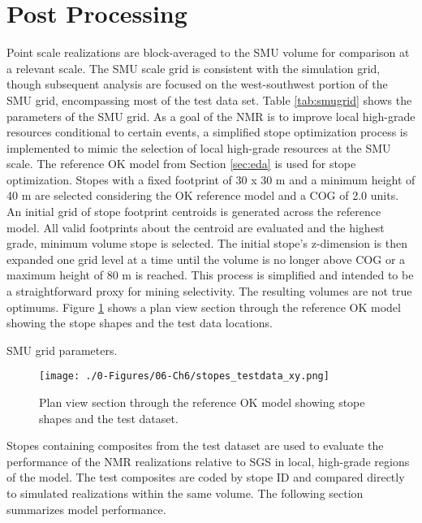 \FloatBarrier
\section{Post Processing}
\label{sec:post}

Point scale realizations are block-averaged to the \gls{SMU} volume for comparison at a relevant scale. The \gls{SMU} scale grid is consistent with the simulation grid, though subsequent analysis are focused on the west-southwest portion of the \gls{SMU} grid, encompassing most of the test data set. Table \ref{tab:smugrid} shows the parameters of the \gls{SMU} grid. As a goal of the \gls{NMR} is to improve local high-grade resources conditional to certain events, a simplified stope optimization process is implemented to mimic the selection of local high-grade resources at the \gls{SMU} scale. The reference \gls{OK} model from Section \ref{sec:eda} is used for stope optimization. Stopes with a fixed footprint of 30 x 30 m and a minimum height of 40 m are selected considering the \gls{OK} reference model and a \gls{COG} of 2.0 units. An initial grid of stope footprint centroids is generated across the reference model. All valid footprints about the centroid are evaluated and the highest grade, minimum volume stope is selected. The initial stope's z-dimension is then expanded one grid level at a time until the volume is no longer above \gls{COG} or a maximum height of 80 m is reached. This process is simplified and intended to be a straightforward proxy for mining selectivity. The resulting volumes are not true optimums. Figure \ref{fig:stopes_testdata_xy} shows a plan view section through the reference \gls{OK} model showing the stope shapes and the test data locations.


\begin{table}[!htb]
    \centering
    \caption{\Gls{SMU} grid parameters.}
    \resizebox{0.9\width}{!}{}
    \label{tab:smugrid}
\end{table}

\begin{figure}[htb!]
    \centering
    \texttt{[image: ./0-Figures/06-Ch6/stopes\_testdata\_xy.png]}
    \caption{Plan view section through the reference \gls{OK} model showing stope shapes and the test dataset. }
    \label{fig:stopes_testdata_xy}
\end{figure}

Stopes containing composites from the test dataset are used to evaluate the performance of the \gls{NMR} realizations relative to \gls{SGS} in local, high-grade regions of the model. The test composites are coded by stope ID and compared directly to simulated realizations within the same volume. The following section summarizes model performance.

